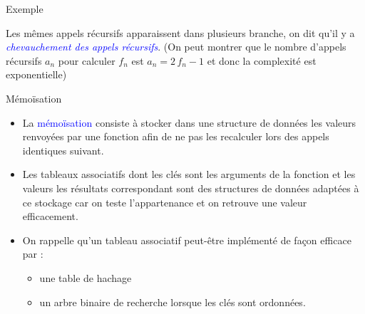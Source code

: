 \documentclass[10pt]{beamer}
\begin{document}
\begin{frame}{\Ctitle}{\stitle}
	\begin{exampleblock}{Exemple}
		\begin{center}
		\end{center}
		 Les mêmes appels récursifs apparaissent dans plusieurs branche, on dit qu'il y a \textcolor{blue}{\textit{chevauchement des appels récursifs}}.
		\onslide<3-> (On peut montrer que le nombre d'appels récursifs $a_n$ pour calculer $f_n$ est $a_n = 2\,f_n -1$ et donc la complexité est exponentielle)
	\end{exampleblock}
\end{frame}



\begin{frame}{\Ctitle}{\stitle}
	\begin{alertblock}{Mémoïsation}
		\begin{itemize}
			\item<1-> La \textcolor{blue}{mémoïsation} consiste à stocker dans une structure de données les valeurs renvoyées par une fonction afin de ne pas les recalculer lors des appels identiques suivant.\\
			\item<2-> Les tableaux associatifs dont les clés sont les arguments de la fonction et les valeurs les résultats correspondant sont des structures de données adaptées à ce stockage car on teste l'appartenance et on retrouve une valeur efficacement.
			\item<3-> On rappelle qu'un tableau associatif peut-être implémenté de façon efficace par :
				\begin{itemize}
					\item une table de hachage
					\item un arbre binaire de recherche lorsque les clés sont ordonnées.
				\end{itemize}
		\end{itemize}
	\end{alertblock}
\end{frame}
\end{document}
